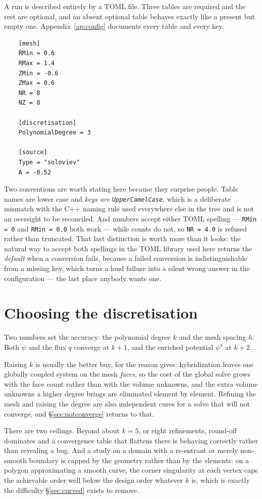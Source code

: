 A run is described entirely by a TOML file. Three tables are required and the
rest are optional, and an absent optional table behaves exactly like a present
but empty one. Appendix~\ref{ap:config} documents every table and every key.

\begin{verbatim}
    [mesh]
    RMin = 0.6
    RMax = 1.4
    ZMin = -0.6
    ZMax = 0.6
    NR = 8
    NZ = 8

    [discretisation]
    PolynomialDegree = 3

    [source]
    Type = "soloviev"
    A = -0.52
\end{verbatim}

Two conventions are worth stating here because they surprise people. Table names
are lower case and \emph{keys are \texttt{UpperCamelCase}}, which is a
deliberate mismatch with the C++ naming rule used everywhere else in the tree
and is not an oversight to be reconciled. And numbers accept either TOML
spelling --- \texttt{RMin = 0} and \texttt{RMin = 0.0} both work --- while
counts do not, so \texttt{NR = 4.0} is refused rather than truncated. That last
distinction is worth more than it looks: the natural way to accept both
spellings in the TOML library used here returns the \emph{default} when a
conversion fails, because a failed conversion is indistinguishable from a
missing key, which turns a loud failure into a silent wrong answer in the
configuration --- the last place anybody wants one.

\section{Choosing the discretisation}

Two numbers set the accuracy: the polynomial degree $k$ and the mesh spacing
$h$. Both $\psi$ and the flux $q$ converge at $k+1$, and the enriched potential
$\psi^{\star}$ at $k+2$.

Raising $k$ is usually the better buy, for the reason  gives:
hybridization leaves one globally coupled system on the mesh \emph{faces}, so
the cost of the global solve grows with the face count rather than with the
volume unknowns, and the extra volume unknowns a higher degree brings are
eliminated element by element. Refining the mesh and raising the degree are also
independent cures for a solve that will not converge, and \S\ref{sec:notconverge}
returns to that.

There are two ceilings. Beyond about $k = 5$, or eight refinements, round-off
dominates and a convergence table that flattens there is behaving correctly
rather than revealing a bug. And a study on a domain with a re-entrant or merely
non-smooth boundary is capped by the geometry rather than by the elements: on a
polygon approximating a smooth curve, the corner singularity at each vertex caps
the achievable order well below the design order whatever $k$ is, which is
exactly the difficulty \S\ref{sec:curved} exists to remove.


